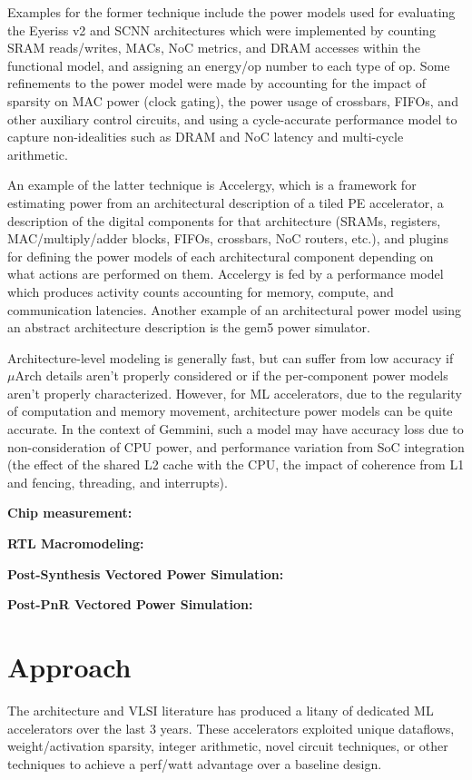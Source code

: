 \documentclass[sigconf]{acmart}
\begin{document}
Examples for the former technique include the power models used for evaluating the Eyeriss v2\cite{eyerissv2} and SCNN\cite{scnn} architectures which were implemented by counting SRAM reads/writes, MACs, NoC metrics, and DRAM accesses within the functional model, and assigning an energy/op number to each type of op.
Some refinements to the power model were made by accounting for the impact of sparsity on MAC power (clock gating), the power usage of crossbars, FIFOs, and other auxiliary control circuits, and using a cycle-accurate performance model to capture non-idealities such as DRAM and NoC latency and multi-cycle arithmetic.

An example of the latter technique is Accelergy\cite{accelergy}, which is a framework for estimating power from an architectural description of a tiled PE accelerator, a description of the digital components for that architecture (SRAMs, registers, MAC/multiply/adder blocks, FIFOs, crossbars, NoC routers, etc.), and plugins for defining the power models of each architectural component depending on what actions are performed on them.
Accelergy is fed by a performance model which produces activity counts accounting for memory, compute, and communication latencies.
Another example of an architectural power model using an abstract architecture description is the gem5 power simulator\cite{gem5power}.

Architecture-level modeling is generally fast, but can suffer from low accuracy if $\mu$Arch details aren't properly considered or if the per-component power models aren't properly characterized. However, for ML accelerators, due to the regularity of computation and memory movement, architecture power models can be quite accurate. In the context of Gemmini, such a model may have accuracy loss due to non-consideration of CPU power, and performance variation from SoC integration (the effect of the shared L2 cache with the CPU, the impact of coherence from L1 and fencing, threading, and interrupts).

\textbf{Chip measurement:} 

    \textbf{RTL Macromodeling:}

    \textbf{Post-Synthesis Vectored Power Simulation:}

    \textbf{Post-PnR Vectored Power Simulation:}
\section{Approach}

The architecture and VLSI literature has produced a litany of dedicated ML accelerators over the last 3 years.
These accelerators exploited unique dataflows, weight/activation sparsity, integer arithmetic, novel circuit techniques, or other techniques to achieve a perf/watt advantage over a baseline design.
\end{document}
